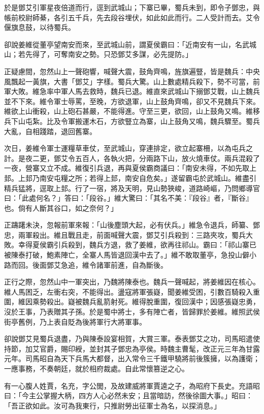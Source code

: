 於是鄧艾引軍星夜倍道而行，逕到武城山；下寨已畢，蜀兵未到，即令子鄧忠，與帳前校尉師綦，各引五千兵，先去段谷埋伏，如此如此而行。二人受計而去。艾令偃旗息鼓，以待蜀兵。

卻說姜維從董亭望南安而來，至武城山前，謂夏侯霸曰：「近南安有一山，名武城山；若先得了，可奪南安之勢。只恐鄧艾多謀，必先提防。」

正疑慮間，忽然山上一聲砲響，喊聲大震，鼓角齊鳴，旌旗遍豎，皆是魏兵：中央風飄起一黃旗，大書「鄧艾」字樣。蜀兵大驚。山上數處精兵殺下，勢不可當，前軍大敗。維急率中軍人馬去救時，魏兵已退。維直來武城山下搦鄧艾戰，山上魏兵並不下來。維令軍士辱罵，至晚，方欲退軍，山上鼓角齊鳴，卻又不見魏兵下來。維欲上山衝殺，山上砲石甚嚴，不能得進。守至三更，欲回，山上鼓角又鳴。維移兵下山屯紮。比及令軍搬運木石，方欲豎立為寨，山上鼓角又鳴，魏兵驟至。蜀兵大亂，自相踐踏，退回舊寨。

次日，姜維令軍士運糧草車仗，至武城山，穿連排定，欲立起寨柵，以為屯兵之計。是夜二更，鄧艾令五百人，各執火把，分兩路下山，放火燒車仗。兩兵混殺了一夜，營寨又立不成。維復引兵退，再與夏侯霸商議曰：「南安未得，不如先取上邽。上邽乃南安屯糧之所；若得上邽，南安自危矣。」遂留霸屯於武城山。維盡引精兵猛將，逕取上邽。行了一宿，將及天明，見山勢狹峻，道路崎嶇，乃問鄉導官曰：「此處何名？」答曰：「段谷。」維大驚曰：「其名不美：『段谷』者，『斷谷』也。倘有人斷其谷口，如之奈何？」

正躊躇未決，忽報前軍來報：「山後塵頭大起，必有伏兵。」維急令退兵，師纂、鄧忠，兩軍殺出。維且戰且走，前面喊聲大震，鄧艾引兵殺到：三路夾攻，蜀兵大敗。幸得夏侯霸引兵殺到，魏兵方退，救了姜維，欲再往祁山。霸曰：「祁山寨已被陳泰打破，鮑素陣亡，全寨人馬皆退回漢中去了。」維不敢取董亭，急投山僻小路而回。後面鄧艾急追，維令諸軍前進，自為斷後。

正行之際，忽然山中一軍突出，乃魏將陳泰也。魏兵一聲喊起，將姜維因在核心。維人馬困乏，左衝右突，不能得出。盪寇將軍張嶷，聞姜維受困，引數百騎殺入重圍，維因乘勢殺出。嶷被魏兵亂箭射死。維得脫重圍，復回漢中；因感張嶷忠勇，沒於王事，乃表贈其子孫。於是蜀中將士，多有陣亡者，皆歸罪於姜維。維照武侯街亭舊例，乃上表自貶為後將軍行大將軍事。

卻說鄧艾見蜀兵退盡，乃與陳泰設宴相賀，大賞三軍。泰表鄧艾之功，司馬昭遣使持節，加艾官爵，賜印綬，並封其子鄧忠為亭侯。時魏主曹髦，改正元三年為甘露元年。司馬昭自為天下兵馬大都督，出入常令三千鐵甲驍將前後簇擁，以為護衛；一應事務，不奏朝廷，就於相府裁處。自此常懷篡逆之心。

有一心腹人姓賈，名充，字公閭，及故建威將軍賈逵之子，為昭府下長史。充語昭曰：「今主公掌握大柄，四方人心必然未安；且當暗訪，然後徐圖大事。」昭曰：「吾正欲如此。汝可為我東行，只推尉勞出征軍士為名，以探消息。」

